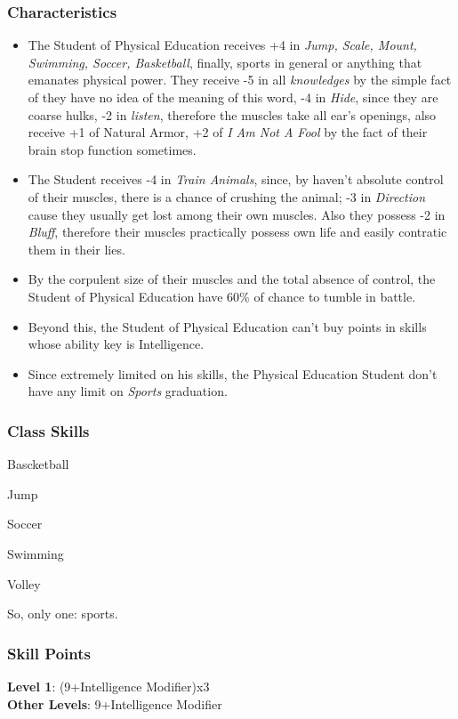 \documentclass[ letterpaper,12pt]{article}
\begin{document}
\subsubsection{Characteristics}
\begin{itemize}
\item{The   Student   of   Physical   Education receives  +4  in  {\it Jump,   Scale,   Mount, Swimming,  Soccer,  Basketball},  finally, sports  in  general  or   anything that emanates physical power. They receive -5 in all {\it knowledges} by the simple fact of they have no idea of the meaning of this word, -4 in {\it Hide}, since they are coarse hulks, -2 in {\it listen}, therefore  the muscles take all ear's openings, also receive +1 of Natural Armor, +2 of {\it I Am Not A Fool} by the fact of their brain stop function sometimes.}
\item{The  Student  receives  -4 in {\it Train Animals}, since, by haven't absolute control of their muscles,  there  is  a chance of crushing the animal; -3 in {\it Direction} cause they usually get lost among their own muscles. Also  they possess -2 in {\it Bluff}, therefore their muscles practically possess own life and easily contratic them in their lies.}
\item{By  the  corpulent size of their muscles and the total absence of control, the Student of Physical Education have 60\% of chance to tumble in battle.}
\item{Beyond this, the Student of Physical Education can't buy points in skills whose ability key is Intelligence.}
\item{Since extremely limited on his skills, the Physical Education Student don't have any limit on {\it Sports} graduation.}
\end{itemize}

\subsubsection{Class Skills}
\begin{itemize}
{\it 
\item{Bascketball}
\item{Jump}
\item{Soccer}
\item{Swimming}
\item{Volley}
\item{So, only one: sports.}
}
\end{itemize}

\subsubsection{Skill Points}
{\bf Level 1}: (9+Intelligence Modifier)x3\\
{\bf Other Levels}: 9+Intelligence Modifier\\
\end{document}
